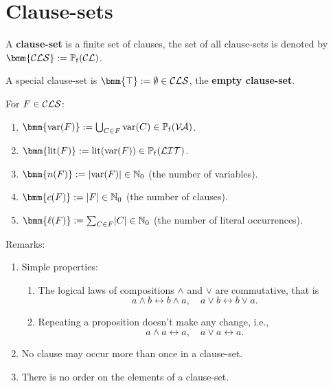\documentclass[12pt]{book}
\begin{document}
\section{Clause-sets}
\label{sec:cls}

\begin{defi}\label{def:cls}
  A \textbf{clause-set} is a finite set of clauses, the set of all clause-sets is denoted by $\bmm{\Cls} := \pote(\Cl)$.

  A special clause-set is $\bmm{\top} := \es \in \Cls$, the \textbf{empty clause-set}.
\end{defi}

\begin{defi}\label{def:clsbasicops}
  For $F \in \mathcal{CLS}$:
  \begin{enumerate}
  \item $\bmm{\var(F)} := \bc_{C \in F} \var(C) \in \pote(\Va)$.
  \item $\bmm{\lit(F)} := \lit(\var(F)) \in \pote(\Lit)$.
  \item $\bmm{n(F)} := \abs{\var(F)} \in \NNZ$ (the number of variables).
  \item $\bmm{c(F)} := \abs{F} \in \NNZ$ (the number of clauses).
  \item $\bmm{\ell(F)} := \sum_{C \in F} \abs{C} \in \NNZ$ (the number of literal occurrences).
  \end{enumerate}
\end{defi}
Remarks:
\begin{enumerate}
\item Simple properties:
  \begin{enumerate}
  \item The logical laws of compositions $\wedge$ and $\vee$ are commutative, that is
  \begin{displaymath}
     a\wedge b \leftrightarrow b\wedge a, \quad  a\vee b \leftrightarrow b\vee a.
  \end{displaymath} 
  \item Repeating a proposition doesn't make any change, i.e.,
     \begin{displaymath}
      a\wedge a \leftrightarrow a, \quad  a\vee a \leftrightarrow a.
    \end{displaymath}
 \end{enumerate}
 \item No clause may occur more than once in a clause-set.
 \item There is no order on the elements of a clause-set.
\end{enumerate}
\end{document}
